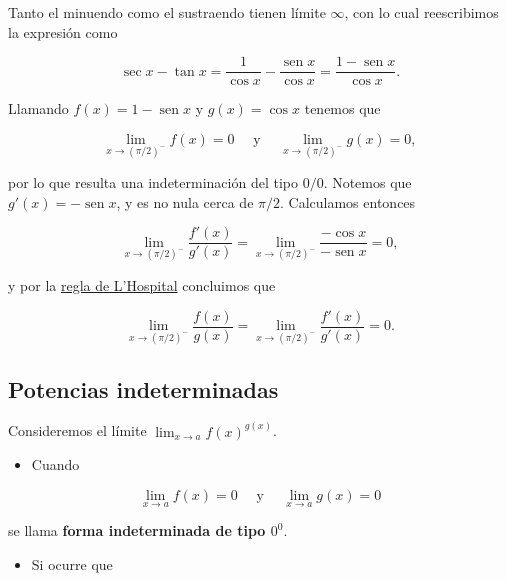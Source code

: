 \documentclass[
  letterpaper,
]{book}
\providecommand{\tightlist}{%
  \setlength{\itemsep}{0pt}\setlength{\parskip}{0pt}}
\theoremstyle{plain}
\theoremstyle{remark}
\begin{document}
\begin{tcolorbox}[enhanced jigsaw, opacityback=0, left=2mm, opacitybacktitle=0.6, toprule=.15mm, bottomrule=.15mm, colbacktitle=quarto-callout-tip-color!10!white, titlerule=0mm, bottomtitle=1mm, title=\textcolor{quarto-callout-tip-color}{\faLightbulb}\hspace{0.5em}{Solución}, toptitle=1mm, colframe=quarto-callout-tip-color-frame, colback=white, breakable, rightrule=.15mm, arc=.35mm, leftrule=.75mm, coltitle=black]

Tanto el minuendo como el sustraendo tienen límite \(\infty\), con lo
cual reescribimos la expresión como

\[
\sec x-\tan x=\frac{1}{\cos x}-\frac{\operatorname{sen} x}{\cos x}=\frac{1-\operatorname{sen} x}{\cos x}.
\]

Llamando \(f(x)=1-\operatorname{sen} x\) y \(g(x)=\cos x\) tenemos que

\[
\lim_{x\to (\pi/2)^-} f(x)=0 \quad \text{ y } \quad  \lim_{x\to (\pi/2)^-}g(x)= 0,
\]

por lo que resulta una indeterminación del tipo \(0/0\). Notemos que
\(g'(x)=-\operatorname{sen} x\), y es no nula cerca de \(\pi/2\).
Calculamos entonces

\[
\lim_{x\to (\pi/2)^-}\frac{f'(x)}{g'(x)}=\lim_{x\to (\pi/2)^-}\frac{-\cos x}{-\operatorname{sen} x}=0,
\]

y por la \hyperref[teo-regla-LH]{regla de L'Hospital} concluimos que

\[
\lim_{x\to (\pi/2)^-}\frac{f(x)}{g(x)}=\lim_{x\to (\pi/2)^-}\frac{f'(x)}{g'(x)}=0.
\]

\end{tcolorbox}

\subsection{Potencias indeterminadas}\label{potencias-indeterminadas}

Consideremos el límite \(\displaystyle \lim_{x\to a} f(x)^{g(x)}\).

\begin{itemize}
\tightlist
\item
  Cuando
\end{itemize}

\[
\lim_{x\to a}f(x)=0\quad\text{ y }\quad \lim_{x\to a}g(x)=0
\]

se llama \textbf{forma indeterminada de tipo \(0^0\)}.

\begin{itemize}
\tightlist
\item
  Si ocurre que
\end{itemize}
\end{document}
